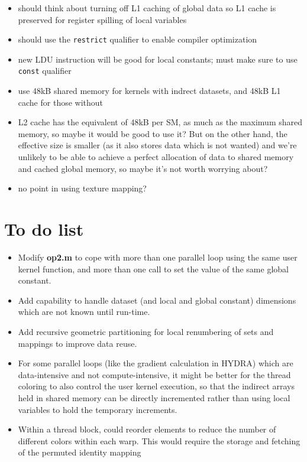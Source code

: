 \documentclass[12pt]{article}
\begin{document}
\begin{itemize}
\item
should think about turning off L1 caching of global data so L1 cache is 
preserved for register spilling of local variables

\item
should use the {\tt restrict} qualifier to enable compiler optimization

\item
new LDU instruction will be good for local constants; must make sure to use
{\tt const} qualifier

\item
use 48kB shared memory for kernels with indrect datasets, and
48kB L1 cache for those without

\item
L2 cache has the equivalent of 48kB per SM, as much as the maximum 
shared memory, so maybe it would be good to use it?  But on the other 
hand, the effective size is smaller (as it also stores data which is 
not wanted) and we're unlikely to be able to achieve a perfect 
allocation of data to shared memory and cached global memory, so 
maybe it's not worth worrying about?

\item
no point in using texture mapping?

\end{itemize}

\newpage

\section{To do list}

\begin{itemize}
\item
Modify {\bf op2.m} to cope with more than one parallel loop using 
the same user kernel function, and more than one call to set the 
value of the same global constant.

\item
Add capability to handle dataset (and local and global constant) dimensions 
which are not known until run-time.

\item
Add recursive geometric partitioning for local renumbering of sets and 
mappings to improve data reuse.

\item
For some parallel loops (like the gradient calculation in HYDRA)
which are data-intensive and not compute-intensive, it might be better 
for the thread coloring to also control the user kernel execution, so 
that the indirect arrays held in shared memory can be directly incremented 
rather than using local variables to hold the temporary increments.

\item
Within a thread block, could reorder elements to reduce the number of 
different colors within each warp.  This would require the storage and 
fetching of the permuted identity mapping 

\end{itemize}
\end{document}
